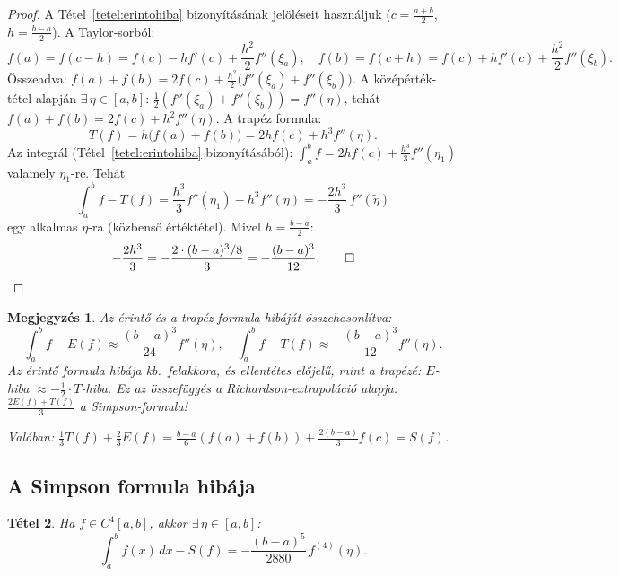 \documentclass[a4paper,12pt]{article}
\theoremstyle{mydef}
\newtheorem{tetel}{Tétel}[section]
\newtheorem{megjegyzes}[tetel]{Megjegyzés}
\begin{document}
\begin{proof}
A Tétel~\ref{tetel:erintohiba} bizonyításának jelöléseit használjuk ($c = \tfrac{a+b}{2}$,
$h = \tfrac{b-a}{2}$). A Taylor-sorból:
\[
  f(a) = f(c-h) = f(c) - hf'(c) + \frac{h^2}{2}f''(\xi_a),
  \quad
  f(b) = f(c+h) = f(c) + hf'(c) + \frac{h^2}{2}f''(\xi_b).
\]
Összeadva: $f(a) + f(b) = 2f(c) + \frac{h^2}{2}\bigl(f''(\xi_a) + f''(\xi_b)\bigr)$.
A középérték-tétel alapján $\exists\,\eta \in [a,b]$:
$\tfrac{1}{2}(f''(\xi_a)+f''(\xi_b)) = f''(\eta)$,
tehát $f(a)+f(b) = 2f(c) + h^2 f''(\eta)$.
A trapéz formula:
\[
  T(f) = h\bigl(f(a)+f(b)\bigr) = 2hf(c) + h^3 f''(\eta).
\]
Az integrál (Tétel~\ref{tetel:erintohiba} bizonyításából):
$\int_a^b f = 2hf(c) + \tfrac{h^3}{3}f''(\eta_1)$ valamely $\eta_1$-re. Tehát
\[
  \int_a^b f - T(f) = \frac{h^3}{3}f''(\eta_1) - h^3 f''(\eta) = -\frac{2h^3}{3}\,f''(\tilde\eta)
\]
egy alkalmas $\tilde\eta$-ra (közbenső értéktétel). Mivel $h = \tfrac{b-a}{2}$:
\[
  -\frac{2h^3}{3} = -\frac{2\cdot(b-a)^3/8}{3} = -\frac{(b-a)^3}{12}. \qed
\]
\end{proof}

\begin{megjegyzes}
Az érintő és a trapéz formula hibáját összehasonlítva:
\[
  \int_a^b f - E(f) \approx \frac{(b-a)^3}{24}f''(\eta),\quad
  \int_a^b f - T(f) \approx -\frac{(b-a)^3}{12}f''(\eta).
\]
Az érintő formula hibája kb.\ \emph{felakkora, és ellentétes előjelű}, mint a trapézé:
$E$-hiba $\approx -\tfrac{1}{2}\cdot T$-hiba. Ez az összefüggés a Richardson-extrapoláció
alapja: $\tfrac{2E(f)+T(f)}{3}$ a Simpson-formula!

Valóban: $\tfrac{1}{3}T(f) + \tfrac{2}{3}E(f) = \tfrac{b-a}{6}(f(a)+f(b)) + \tfrac{2(b-a)}{3}f(c) = S(f)$.
\end{megjegyzes}

\subsection*{A Simpson formula hibája}

\begin{mdframed}[backgroundcolor=thmbg,linewidth=0pt,innertopmargin=8pt,innerbottommargin=8pt]
\begin{tetel}
\label{tetel:simpsonhiba}
Ha $f \in C^4[a,b]$, akkor $\exists\,\eta \in [a,b]$:
\[
  \int_a^b f(x)\,dx - S(f) = -\frac{(b-a)^5}{2880}\,f^{(4)}(\eta).
\]
\end{tetel}
\end{mdframed}
\end{document}
